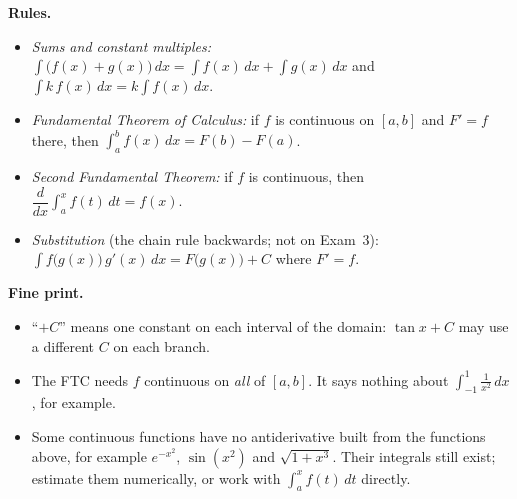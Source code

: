 \documentclass[11pt]{article}
\begin{document}
\smallskip
{\small\noindent\textbf{Rules.}
\begin{itemize}[leftmargin=1.2em,itemsep=2pt,topsep=2pt]
\item \emph{Sums and constant multiples:} $\int\big(f(x)+g(x)\big)\,dx=\int f(x)\,dx+\int g(x)\,dx$ and $\int k\,f(x)\,dx=k\int f(x)\,dx$.
\item \emph{Fundamental Theorem of Calculus:} if $f$ is continuous on $[a,b]$ and $F'=f$ there, then $\int_a^bf(x)\,dx=F(b)-F(a)$.
\item \emph{Second Fundamental Theorem:} if $f$ is continuous, then $\dfrac{d}{dx}\displaystyle\int_a^xf(t)\,dt=f(x)$.
\item \emph{Substitution} (the chain rule backwards; not on Exam~3): $\int f\big(g(x)\big)\,g'(x)\,dx=F\big(g(x)\big)+C$ where $F'=f$.
\end{itemize}

\noindent\textbf{Fine print.}
\begin{itemize}[leftmargin=1.2em,itemsep=2pt,topsep=2pt]
\item ``$+C$'' means one constant on each interval of the domain: $\tan x+C$ may use a different $C$ on each branch.
\item The FTC needs $f$ continuous on \emph{all} of $[a,b]$. It says nothing about $\int_{-1}^1\frac1{x^2}\,dx$, for example.
\item Some continuous functions have no antiderivative built from the functions above, for example $e^{-x^2}$, $\sin(x^2)$ and $\sqrt{1+x^3}$. Their integrals still exist; estimate them numerically, or work with $\int_a^xf(t)\,dt$ directly.
\end{itemize}
}
\end{document}
